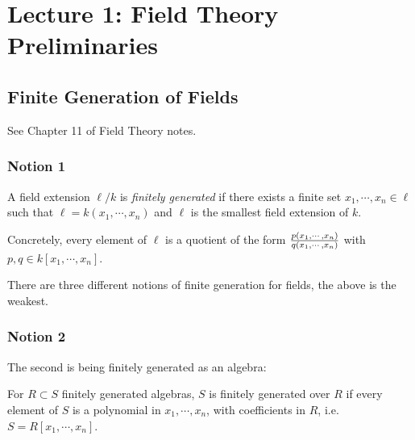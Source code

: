 \newpage

\tableofcontents
\newpage

\hypertarget{lecture-1-field-theory-preliminaries}{%
\section{Lecture 1: Field Theory
Preliminaries}\label{lecture-1-field-theory-preliminaries}}

\hypertarget{finite-generation-of-fields}{%
\subsection{Finite Generation of
Fields}\label{finite-generation-of-fields}}

See Chapter 11 of Field Theory notes.

\hypertarget{notion-1}{%
\subsubsection{Notion 1}\label{notion-1}}

\begin{definition}

A field extension \(\ell/k\) is \emph{finitely generated} if there
exists a finite set \(x_1, \cdots, x_n \in \ell\) such that
\(\ell = k(x_1, \cdots, x_n)\) and \(\ell\) is the smallest field
extension of \(k\).

Concretely, every element of \(\ell\) is a quotient of the form
\({p(x_1, \cdots, x_n) \over q(x_1, \cdots, x_n)}\) with
\(p, q\in k[x_1, \cdots, x_n]\).

\end{definition}

There are three different notions of finite generation for fields, the
above is the weakest.

\hypertarget{notion-2}{%
\subsubsection{Notion 2}\label{notion-2}}

The second is being finitely generated as an algebra:

\begin{definition}

For \(R\subset S\) finitely generated algebras, \(S\) is finitely
generated over \(R\) if every element of \(S\) is a polynomial in
\(x_1, \cdots, x_n\), with coefficients in \(R\),
i.e.~\(S = R[x_1, \cdots, x_n]\).

\end{definition}

